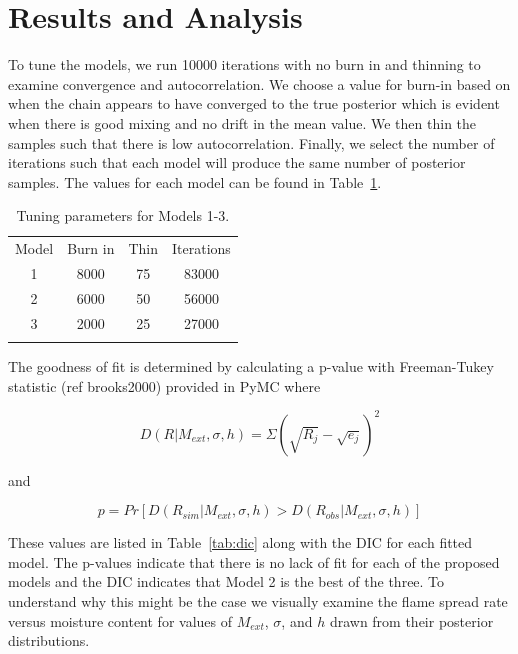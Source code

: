 \documentclass[11pt]{article}
\begin{document}
\section{Results and Analysis}
\label{sec:res}

To tune the models, we run 10000 iterations with no burn in and thinning to examine convergence and autocorrelation. We choose a value for burn-in based on when the chain appears to have converged to the true posterior which is evident when there is good mixing and no drift in the mean value. We then thin the samples such that there is low autocorrelation. Finally, we select the number of iterations such that each model will produce the same number of posterior samples. The values for each model can be found in Table~\ref{tab:tune}.

\begin{table}[h]
\caption{Tuning parameters for Models 1-3.}
\begin{center}
  \begin{tabular}{cccc}
    \hline\noalign{\smallskip}
    Model & Burn in & Thin & Iterations \\
    \noalign{\smallskip}\hline\noalign{\smallskip}
    1 & 8000 & 75 & 83000 \\
    2 & 6000 & 50 & 56000 \\ 
    3 & 2000 & 25 & 27000 \\ 
    \noalign{\smallskip}\hline
  \end{tabular}
\end{center}
\label{tab:tune}
\end{table}
\newpage
The goodness of fit is determined by calculating a p-value with Freeman-Tukey statistic (ref brooks2000) provided in PyMC where  

\begin{equation}
D(R|M_{ext},\sigma,h) = \Sigma(\sqrt{R_j} - \sqrt{e_j})^2
\label{eq:D_val}
\end{equation}

\noindent and

\begin{equation}
p = Pr[D(R_{sim}|M_{ext},\sigma,h) > D(R_{obs}|M_{ext},\sigma,h)]
\label{eq:p_val}
\end{equation}

These values are listed in Table~\ref{tab:dic} along with the DIC for each fitted model. The p-values indicate that there is no lack of fit for each of the proposed models and the DIC indicates that Model 2 is the best of the three. To understand why this might be the case we visually examine the flame spread rate versus moisture content for values of $M_{ext}$, $\sigma$, and $h$ drawn from their posterior distributions.
\end{document}
